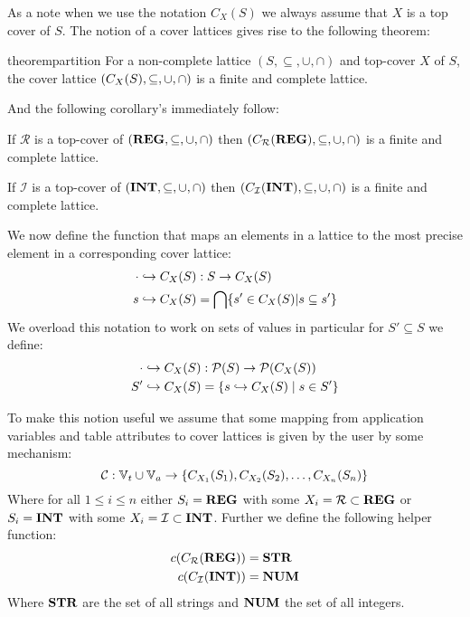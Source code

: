As a note when we use the notation $C_X(S)$ we always assume that $X$ is a top cover of $S$.
The notion of a cover lattices gives rise to the following theorem:

\begin{restatable}{theorem}{partition}\label{thm:partition}
For a non-complete lattice $(S, \subseteq, \cup, \cap)$ and top-cover $X$ of $S$, the cover lattice $(C_{X}(S), \subseteq, \cup, \cap)$ is a finite and complete lattice.
\end{restatable}

And the following corollary's immediately follow:

\begin{corollary}
    If $\mathcal{R}$ is a top-cover of $(\mathbf{REG}, \subseteq, \cup, \cap)$ then $(C_{\mathcal{R}}(\mathbf{REG}), \subseteq, \cup, \cap)$ is a finite and complete lattice.
\end{corollary}

\begin{corollary}
    If $\mathcal{I}$ is a top-cover of $(\mathbf{INT}, \subseteq, \cup, \cap)$ then $(C_{\mathcal{I}}(\mathbf{INT}), \subseteq, \cup, \cap)$ is a finite and complete lattice.
\end{corollary}

We now define the function that maps an elements in a lattice to the most precise element in a corresponding cover lattice:
\begin{align}
    \cdot \hookrightarrow C_X(S) &: S\rightarrow C_X(S) \\
    s \hookrightarrow C_X(S) &= \bigcap\{s' \in C_X(S)|s \subseteq s'\}
\end{align}
We overload this notation to work on sets of values in particular for $S' \subseteq S$ we define:
\begin{align}
    \cdot \hookrightarrow C_X(S) &: \mathcal{P}(S) \rightarrow \mathcal{P}(C_X(S)) \\
    S' \hookrightarrow C_X (S) &= \{s \hookrightarrow C_X(S) \mid s \in S'\}
\end{align}

To make this notion useful we assume that some mapping from application variables and table attributes to cover lattices is given by the user by some mechanism:
\begin{equation}\label{eq:lookupcl}
    \lookupcl : \mathbb{V}_t \cup \mathbb{V}_a \rightarrow \{ C_{X_1}(S_1), C_{X_2}(S_2), \dots, C_{X_n}(S_n) \}
\end{equation}
Where for all $1 \leq i \leq n$ either $S_i = \mathbf{REG}$ with some $X_i = \mathcal{R} \subset \mathbf{REG}$ or $S_i = \mathbf{INT}$ with some $X_i = \mathcal{I} \subset \mathbf{INT}$.
Further we define the following helper function:
\begin{align}
    c(C_{\mathcal{R}}(\mathbf{REG})) &= \mathbf{STR} \\
    c(C_{\mathcal{I}}(\mathbf{INT})) &= \mathbf{NUM}
\end{align}
Where $\mathbf{STR}$ are the set of all strings and $\mathbf{NUM}$ the set of all integers.

